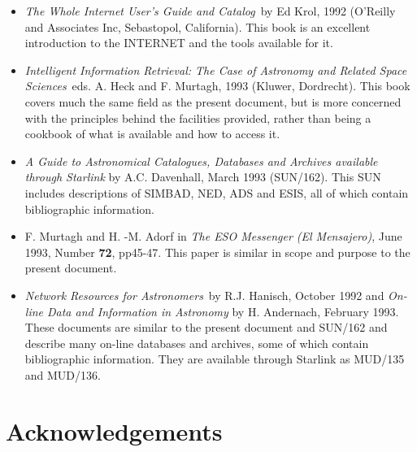 \documentclass[twoside,11pt]{article}
\newcommand{\xref}[3]{#1}
\newcommand{\xlabel}[1]{}
\begin{document}
\begin{itemize}

  \item {\it The Whole Internet User's Guide and
   Catalog}\, by Ed Krol, 1992 (O'Reilly and Associates Inc,
   Sebastopol, California). This book is an excellent introduction to
   the INTERNET and the tools available for it.

  \item {\it Intelligent Information Retrieval: The Case of Astronomy
   and Related Space Sciences}\, eds. A. Heck and F. Murtagh, 1993
   (Kluwer, Dordrecht). This book covers much the same field as the
   present document, but is more concerned with the principles behind
   the facilities provided, rather than being a cookbook of what is
   available and how to access it.

  \item {\it A Guide to Astronomical Catalogues, Databases and Archives
   available through Starlink} by A.C. Davenhall, March 1993
   (\xref{SUN/162}{sun162}{}).
   This SUN includes descriptions of SIMBAD, NED, ADS and ESIS, all of
   which contain bibliographic information.

  \item F. Murtagh and H. -M. Adorf in {\it The ESO Messenger (El
   Mensajero)}, June 1993, Number {\bf 72}, pp45-47. This paper is
   similar in scope and purpose to the present document.

  \item {\it Network Resources for Astronomers}\, by R.J. Hanisch,
   October 1992 and {\it On-line Data and Information in Astronomy}
   by H. Andernach, February 1993. These documents are similar to the
   present document and \xref{SUN/162}{sun162}{} and describe many on-line
   databases and
   archives, some of which contain bibliographic information. They are
   available through Starlink as MUD/135 and MUD/136.

\end{itemize}


\section{Acknowledgements\xlabel{acknowledgements}}
\end{document}
